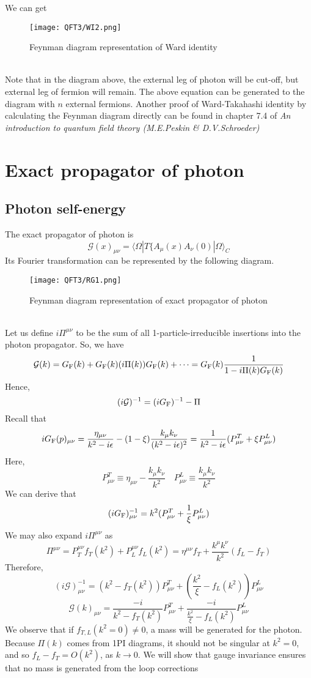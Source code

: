 We can get
\begin{figure}[!h]
\centering
\texttt{[image: QFT3/WI2.png]}
\caption{Feynman diagram representation of Ward identity}
\end{figure}\\
Note that in the diagram above, the external leg of photon will be cut-off, but external leg of fermion will remain.
The above equation can be generated to the diagram with $n$ external fermions. 
Another proof of Ward-Takahashi identity by calculating the Feynman diagram directly can be found in chapter 7.4 of \emph{An introduction to quantum field theory (M.E.Peskin \& D.V.Schroeder)}

\section{Exact propagator of photon}
\subsection{Photon self-energy}
\noindent
The exact propagator of photon is
\[\mathcal{G}(x)_{\mu\nu} = \langle  \Omega | T \{ A_{\mu}(x)A_{\nu}(0)| \Omega \rangle_C\]
Its Fourier transformation can be represented by the following diagram. 
\begin{figure}[!h]
\centering
\texttt{[image: QFT3/RG1.png]}
\caption{Feynman diagram representation of exact propagator of photon}
\end{figure}\\
Let us define $i\Pi^{\mu\nu}$ to be the sum of all 1-particle-irreducible insertions into the photon propagator. So, we have
\[\mathcal{G}(k) = G_{\rm F}(k) + G_{\rm F}(k)(i\Pi(k))G_{\rm F}(k) + \cdots = G_{\rm F}(k) \frac{1}{1-i\Pi(k)G_{\rm F}(k)}\]
Hence,
\[(i\mathcal{G})^{-1} = (iG_{\rm F})^{-1} - \Pi\]
Recall that
\[iG_{\rm F}(p)_{\mu\nu}  = \frac{\eta_{\mu\nu}}{k^2-i\epsilon} - (1-\xi)\frac{k_{\mu}k_{\nu}}{(k^2-i\epsilon)^2} = \frac{1}{k^2-i\epsilon}(P^T_{\mu\nu} + \xi P^L_{\mu\nu})\]
Here, \[P^T_{\mu\nu} \equiv \eta_{\mu\nu} - \frac{k_{\mu}k_{\nu}}{k^2} \quad  P^L_{\mu\nu} \equiv \frac{k_{\mu}k_{\nu}}{k^2}\]
We can derive that
\[(iG_{\rm F})^{-1}_{\mu\nu} = k^2 (P^T_{\mu\nu} + \frac{1}{\xi} P^L_{\mu\nu})\]
We may also expand $i\Pi^{\mu\nu}$ as
\[\Pi^{\mu\nu} = P_T^{\mu\nu}f_T(k^2) +  P_L^{\mu\nu}f_L(k^2) = \eta^{\mu\nu}f_T + \frac{k^{\mu}k^{\nu}}{k^2}(f_L-f_T)\]
Therefore,
\[(i\mathcal{G})^{-1}_{\mu\nu} = (k^2-f_T(k^2))P^T_{\mu\nu} + (\frac{k^2}{\xi}-f_L(k^2)) P^L_{\mu\nu}\]
\[\mathcal{G}(k)_{\mu\nu} = \frac{-i}{k^2-f_T(k^2)}P^T_{\mu\nu} + \frac{-i}{\frac{k^2}{\xi}-f_L(k^2)} P^L_{\mu\nu}\]
We observe that if $f_{T,L}(k^2 = 0) \neq 0$, a mass will be generated for the photon. Because $\Pi(k)$ comes from 1PI diagrams, it should not be singular at $k^2 =0 $, and so $f_L - f_T = O(k^2)$, as $k \to 0$. We will show that gauge invariance ensures that no mass is generated from the loop corrections

